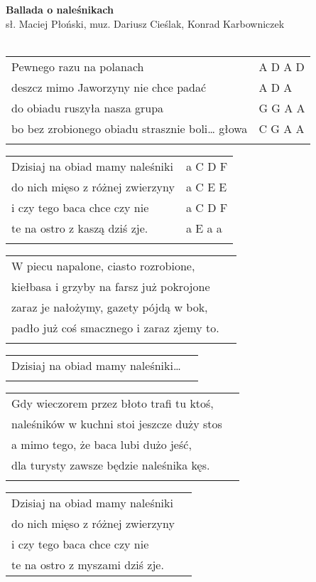 \documentclass[a5paper]{article}
\begin{document}


\noindent
\fontsize{12pt}{15pt}\selectfont
\textbf{Ballada o naleśnikach} \\
\fontsize{8pt}{10pt}\selectfont
sł. Maciej Płoński, muz. Dariusz Cieślak, Konrad Karbowniczek \\ \\
\fontsize{10pt}{12pt}\selectfont
{}
\begin{tabular}{@{}p{8.5cm}p{3cm}@{}}
\noindent
Pewnego razu na polanach & A D A D \\
deszcz mimo Jaworzyny nie chce padać & A D A \\
do obiadu ruszyła nasza grupa & G G A A \\
bo bez zrobionego obiadu strasznie boli… głowa & C G A A \\ \\
\end{tabular}

\noindent
\begin{tabular}{@{}p{7.5cm}p{3cm}@{}}
	Dzisiaj na obiad mamy naleśniki & a C D F \\
	do nich mięso z różnej zwierzyny & a C E E \\
	i czy tego baca chce czy nie & a C D F \\
	te na ostro z kaszą dziś zje. & a E a a \\ \\
\end{tabular}

\noindent
\begin{tabular}{@{}p{9.5cm}p{3cm}@{}}
W piecu napalone, ciasto rozrobione, \\
kiełbasa i grzyby na farsz już pokrojone \\
zaraz je nałożymy, gazety pójdą w bok, \\
padło już coś smacznego i zaraz zjemy to. \\ \\
\end{tabular}

\noindent
\begin{tabular}{@{}p{8.5cm}p{3cm}@{}}
Dzisiaj na obiad mamy naleśniki… \\ \\
\end{tabular}

\noindent
\begin{tabular}{@{}p{9.5cm}p{3cm}@{}}
Gdy wieczorem przez błoto trafi tu ktoś, \\
naleśników w kuchni stoi jeszcze duży stos \\
a mimo tego, że baca lubi dużo jeść, \\
dla turysty zawsze będzie naleśnika kęs. \\ \\
\end{tabular}

\noindent
\begin{tabular}{@{}p{8.5cm}p{3cm}@{}}
Dzisiaj na obiad mamy naleśniki \\
do nich mięso z różnej zwierzyny \\
i czy tego baca chce czy nie \\
te na ostro z myszami dziś zje.
\end{tabular}
\end{document}
